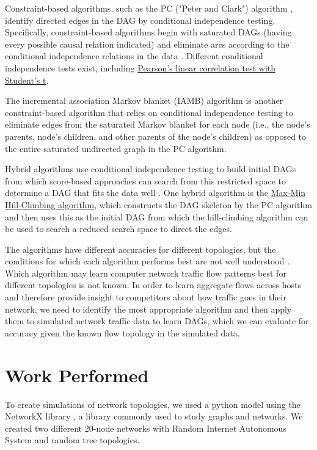 \documentclass[conference]{IEEEtran}
\begin{document}
Constraint-based algorithms, such as the PC ("Peter and Clark") algorithm \cite{b8}, identify directed edges in the DAG by conditional independence testing. Specifically, constraint-based algorithms begin with saturated DAGs (having every possible causal relation indicated) and eliminate arcs according to the conditional independence relations in the data \cite{b7}. Different conditional independence tests exist, including \href{http://www.bnlearn.com/documentation/man/conditional.independence.tests.html}{Pearson's linear correlation test with Student's t}.

The incremental association Markov blanket (IAMB) algorithm is another constraint-based algorithm \cite{b9} that relies on conditional independence testing to eliminate edges from the saturated Markov blanket for each node (i.e., the node's parents, node's children, and other parents of the node's children) as opposed to the entire saturated undirected graph in the PC algorithm.

Hybrid algorithms use conditional independence testing to build initial DAGs from which score-based approaches can search from this restricted space to determine a DAG that fits the data well \cite{b7}. One hybrid algorithm is the  \href{https://link.springer.com/article/10.1007/s10994-006-6889-7}{Max-Min Hill-Climbing algorithm}, which constructs the DAG skeleton by the PC algorithm and then uses this as the initial DAG from which the hill-climbing algorithm can be used to search a reduced search space to direct the edges.

The algorithms have different accuracies for different topologies, but the conditions for which each algorithm performs best are not well understood \cite{b10}. Which algorithm may learn computer network traffic flow patterns best for different topologies is not known. In order to learn aggregate flows across hosts and therefore provide insight to competitors about how traffic goes in their network, we need to identify the most appropriate algorithm and then apply them to simulated network traffic data to learn DAGs, which we can evaluate for accuracy given the known flow topology in the simulated data.


\section{Work Performed}

To create simulations of network topologies, we used a python model using the NetworkX library \cite{b11}, a library commonly used to study graphs and networks. We created two different 20-node networks with Random Internet Autonomous System and random tree topologies.
\end{document}
